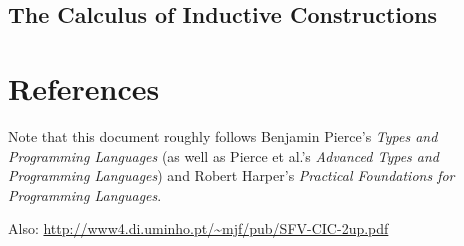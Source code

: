 \documentclass[10pt]{article}
\begin{document}
\subsection{The Calculus of Inductive Constructions}

\section{References}


Note that this document roughly follows Benjamin Pierce's \emph{Types and Programming Languages} (as well as Pierce et al.'s \emph{Advanced Types and Programming Languages}) and Robert Harper's \emph{Practical Foundations for Programming Languages}.

Also:
\url{http://www4.di.uminho.pt/~mjf/pub/SFV-CIC-2up.pdf}
\end{document}
